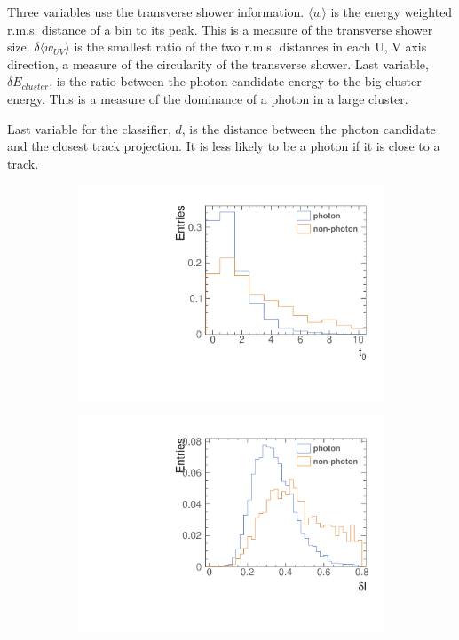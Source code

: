 Three variables use the transverse shower information. $\langle{w}\rangle$ is the energy weighted r.m.s. distance of a bin to its peak. This is a measure of the transverse shower size. $\delta{\langle{w_{UV}}\rangle}$ is the smallest ratio of the two r.m.s. distances in each U, V axis direction, a measure of the circularity of the transverse shower. Last variable, $\delta E_{cluster}$, is the  ratio between the photon candidate energy to the big cluster energy. This is a measure of the dominance of a photon in a large cluster.

Last variable for the classifier, $d$, is the distance between the photon candidate and the closest track projection. It is less likely to be a photon if it is close to a track.

\begin{figure}[tbph]
\centering
  \begin{subfigure}[b]{0.45\textwidth}
    \includegraphics[width=\textwidth]{photon/likelihood/LongProfileStart.pdf}
    \caption{}
    \label{fig:photonLongProfileStart}
  \end{subfigure}
  \begin{subfigure}[b]{0.45\textwidth}
    \includegraphics[width=\textwidth]{photon/likelihood/LongProfileDiscrepancy.pdf}

\end{subfigure}
\end{figure}
